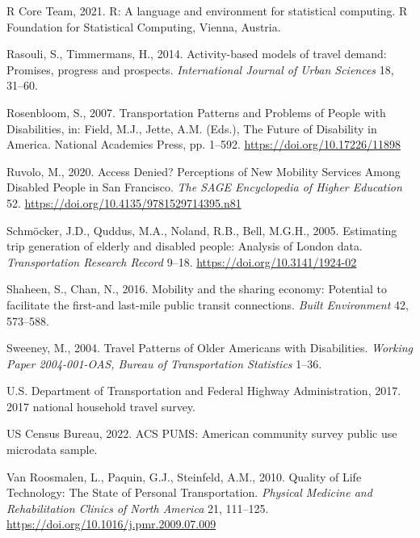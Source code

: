\documentclass[3p, authoryear, review]{elsarticle} %
\newlength{\cslhangindent}
\newenvironment{CSLReferences}[2] %
 {%
  \setlength{\parindent}{0pt}
  \ifodd #1 \everypar{\setlength{\hangindent}{\cslhangindent}}\ignorespaces\fi
  \ifnum #2 > 0
  \setlength{\parskip}{#2\baselineskip}
  \fi
 }%
 {}
\begin{document}
\begin{CSLReferences}{1}{0}
\leavevmode{}%
R Core Team, 2021. R: A language and environment for statistical computing. R Foundation for Statistical Computing, Vienna, Austria.

\leavevmode{}%
Rasouli, S., Timmermans, H., 2014. Activity-based models of travel demand: Promises, progress and prospects. \emph{International Journal of Urban Sciences} 18, 31--60.

\leavevmode{}%
Rosenbloom, S., 2007. {Transportation Patterns and Problems of People with Disabilities}, in: Field, M.J., Jette, A.M. (Eds.), The Future of Disability in America. National Academies Press, pp. 1--592. \url{https://doi.org/10.17226/11898}

\leavevmode{}%
Ruvolo, M., 2020. {Access Denied? Perceptions of New Mobility Services Among Disabled People in San Francisco}. \emph{The SAGE Encyclopedia of Higher Education} 52. \url{https://doi.org/10.4135/9781529714395.n81}

\leavevmode{}%
Schmöcker, J.D., Quddus, M.A., Noland, R.B., Bell, M.G.H., 2005. {Estimating trip generation of elderly and disabled people: Analysis of London data}. \emph{Transportation Research Record} 9--18. \url{https://doi.org/10.3141/1924-02}

\leavevmode{}%
Shaheen, S., Chan, N., 2016. Mobility and the sharing economy: Potential to facilitate the first-and last-mile public transit connections. \emph{Built Environment} 42, 573--588.

\leavevmode{}%
Sweeney, M., 2004. {Travel Patterns of Older Americans with Disabilities}. \emph{Working Paper 2004-001-OAS, Bureau of Transportation Statistics} 1--36.

\leavevmode{}%
U.S. Department of Transportation and Federal Highway Administration, 2017. 2017 national household travel survey.

\leavevmode{}%
US Census Bureau, 2022. ACS PUMS: American community survey public use microdata sample.

\leavevmode{}%
Van Roosmalen, L., Paquin, G.J., Steinfeld, A.M., 2010. {Quality of Life Technology: The State of Personal Transportation}. \emph{Physical Medicine and Rehabilitation Clinics of North America} 21, 111--125. \url{https://doi.org/10.1016/j.pmr.2009.07.009}


\end{CSLReferences}
\end{document}
